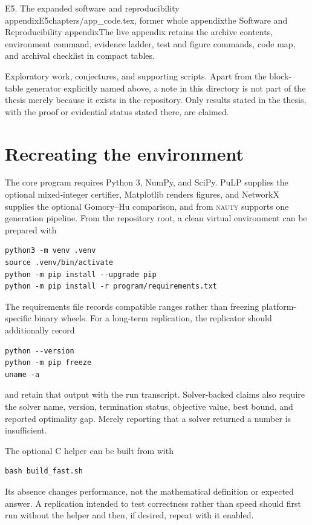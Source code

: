 \begin{offcut}{E5. The expanded software and reproducibility appendix}{E5}{chapters/app\_code.tex, former whole appendix}{the Software and Reproducibility appendix}{The live appendix retains the archive contents, environment command, evidence ladder, test and figure commands, code map, and archival checklist in compact tables.}
\begin{description}[style=nextline]
  \item[\code{research\_notes/}]
  Exploratory work, conjectures, and supporting scripts. Apart from the block-table generator explicitly named above, a note in this directory is not part of the thesis merely because it exists in the repository. Only results stated in the thesis, with the proof or evidential status stated there, are claimed.
\end{description}

\section{Recreating the environment}

The core program requires Python 3, NumPy, and SciPy. PuLP supplies the optional mixed-integer certifier, Matplotlib renders figures, and NetworkX supplies the optional Gomory--Hu comparison, and  from \textsc{nauty} supports one generation pipeline. From the repository root, a clean virtual environment can be prepared with

\begin{verbatim}
python3 -m venv .venv
source .venv/bin/activate
python -m pip install --upgrade pip
python -m pip install -r program/requirements.txt
\end{verbatim}

The requirements file records compatible ranges rather than freezing platform-specific binary wheels. For a long-term replication, the replicator should additionally record

\begin{verbatim}
python --version
python -m pip freeze
uname -a
\end{verbatim}

and retain that output with the run transcript. Solver-backed claims also require the solver name, version, termination status, objective value, best bound, and reported optimality gap. Merely reporting that a solver returned a number is insufficient.

The optional C helper can be built from  with

\begin{verbatim}
bash build_fast.sh
\end{verbatim}
Its absence changes performance, not the mathematical definition or expected answer. A replication intended to test correctness rather than speed should first run without the helper and then, if desired, repeat with it enabled.


\end{offcut}

